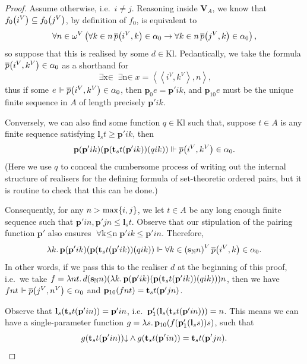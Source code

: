 \documentclass[12pt,openany]{book}
\theoremstyle{plain}
\theoremstyle{definition}
\newcommand\tuple[1]{\left\langle #1 \right\rangle}
\newcommand\opA[1]{\mathop{\forall #1}}
\newcommand\opE[1]{\mathop{\exists #1}}
\newcommand\oplam[1]{\mathop{\lambda #1.}}
\newcommand\Kl{\mathrm{Kl}}
\newcommand\bp{\mathbf{p}}
\newcommand\bsN{\mathbf{s}_\mathbb{N}}
\newcommand\bl{\mathbf{l}}
\newcommand\bt{\mathbf{t}}
\newcommand\bV{\mathbf{V}}
\begin{document}
\begin{proof}
  Assume otherwise, i.e.\ $i \neq j$. Reasoning inside $\bV_A$, we know that $f_0\mleft(i^V\mright) \subseteq f_0\mleft(j^V\mright)$, by definition of $f_0$, is equivalent to
  \[\opA{n \in \omega^V} \left(\opA{k \in n} \overline{p}\mleft(i^V, k\mright) \in \alpha_0 \rightarrow \opA{k \in n} \overline{p}\mleft(j^V, k\mright) \in \alpha_0\right),\]
  so suppose that this is realised by some $d \in \Kl$. Pedantically, we take the formula $\overline{p}\mleft(i^V, k^V\mright) \in \alpha_0$ as a shorthand for
  \[\opE{x \in \overline{p}} \opE{n \in \alpha_0} x = \tuple{\tuple{i^V, k^V}, n},\]
  thus if some $e \Vdash \overline{p}\mleft(i^V, k^V\mright) \in \alpha_0$, then $\bp_0 e = \bp' ik$, and $\bp_{10} e$ must be the unique finite sequence in $A$ of length precisely $\bp' ik$.

  Conversely, we can also find some function $q \in \Kl$ such that, suppose $t \in A$ is any finite sequence satisfying $\bl_s t \geq \bp' ik$, then
  \[\bp \mleft(\bp' ik\mright) \mleft(\bp \mleft(\bt_s t \mleft(\bp' ik\mright)\mright) \mleft(qik\mright)\mright) \Vdash \overline{p}\mleft(i^V, k^V\mright) \in \alpha_0.\]
  (Here we use $q$ to conceal the cumbersome process of writing out the internal structure of realisers for the defining formula of set-theoretic ordered pairs, but it is routine to check that this can be done.)

  Consequently, for any $n > \mathrm{max}\mleft\{i, j\mright\}$, we let $t \in A$ be any long enough finite sequence such that $\bp' in, \bp' jn \leq \bl_s t$. Observe that our stipulation of the pairing function $\bp'$ also ensures $\opA{k \leq n} \bp' ik \leq \bp' in$. Therefore,
  \[\oplam{k} \bp \mleft(\bp' ik\mright) \mleft(\bp \mleft(\bt_s t \mleft(\bp' ik\mright)\mright) \mleft(qik\mright)\mright) \Vdash \opA{k \in \left(\bsN n\right)^V} \overline{p}\mleft(i^V, k\mright) \in \alpha_0.\]
  In other words, if we pass this to the realiser $d$ at the beginning of this proof, i.e.\ we take $f = \oplam{nt} d\mleft(\bsN n\mright) \mleft(\oplam{k} \bp \mleft(\bp' ik\mright) \mleft(\bp \mleft(\bt_s t \mleft(\bp' ik\mright)\mright) \mleft(qik\mright)\mright)\mright) n$, then we have $fnt \Vdash \overline{p}\mleft(j^V, n^V\mright) \in \alpha_0$ and $\bp_{10} \mleft(fnt\mright) = \bt_s t \mleft(\bp' jn\mright)$.

  Observe that $\bl_s \mleft(\bt_s t \mleft(\bp' in\mright)\mright) = \bp' in$, i.e.\ $\bp'_1 \mleft(\bl_s \mleft(\bt_s t \mleft(\bp' in\mright)\mright)\mright) = n$. This means we can have a single-parameter function $g = \oplam{s} \bp_{10}\mleft(f \mleft(\bp'_1 \mleft(\bl_s s\mright)\mright) s\mright)$, such that
  \[g\mleft(\bt_s t \mleft(\bp' in\mright)\mright) {\downarrow} \land g\mleft(\bt_s t \mleft(\bp' in\mright)\mright) = \bt_s t \mleft(\bp' jn\mright).\]


\end{proof}
\end{document}
